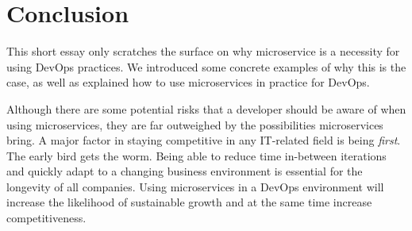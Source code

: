 \documentclass{article}
\begin{document}

\section{Conclusion}
This short essay only scratches the surface on why microservice is a necessity for using DevOps practices. We introduced some concrete examples of why this is the case, as well as explained how to use microservices in practice for DevOps.

Although there are some potential risks that a developer should be aware of when using microservices, they are far outweighed by the possibilities microservices bring. A major factor in staying competitive in any IT-related field is being \textit{first}. The early bird gets the worm. Being able to reduce time in-between iterations and quickly adapt to a changing business environment is essential for the longevity of all companies. Using microservices in a DevOps environment will increase the likelihood of sustainable growth and at the same time increase competitiveness.


\newpage
\printbibliography
\end{document}
